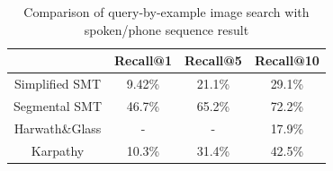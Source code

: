 \documentclass[journal]{IEEEtran}
\begin{document}
\begin{table}[]
    \centering
    \begin{tabular}{|c|c|c|c|}
    \hline
        & Recall@1  & Recall@5   & Recall@10  \\
    \hline
        Simplified SMT & 9.42\% & 21.1\% & 29.1\% \\
        Segmental SMT & 46.7\% & 65.2\%  & 72.2\%  \\
        Harwath\&Glass\cite{Harwath15} & - & - & 17.9\%\\
        Karpathy\cite{Karpathy15} & 10.3\% & 31.4\% & 42.5\%\\
    \hline
    \end{tabular}
    \caption{Comparison of query-by-example image search with spoken/phone sequence result}
    \label{tab:retrieval_results}
\end{table}
%
%

\end{document}
